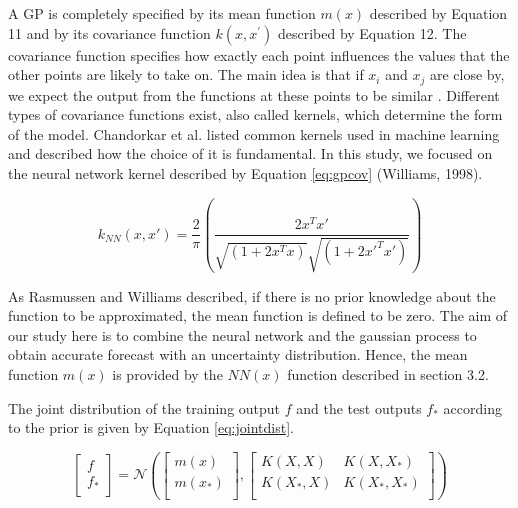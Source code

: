 A GP is completely specified by its mean function  \( m \left( x \right)  \) described by 
Equation 11 and by its covariance function  \( k \left( x,x^{'} \right)  \)  described by Equation 12. 
The covariance function specifies how exactly each point influences the values that the other points are 
likely to take on. The main idea is that if  \( x_{i} \) and  \( x_{j} \)  are close by, 
we expect the output from the functions at these points to be similar . Different types of covariance 
functions exist, also called kernels, which determine the form of the model. Chandorkar et al. \cite{ChandorkarDst} 
listed common kernels used in machine learning and described how the choice of it is fundamental. 
In this study, we focused on the neural network kernel described by Equation \ref{eq:gpcov} (Williams, 1998). 


\begin{equation}\label{eq:gpcov}
 k_{NN} \left( x, x' \right) = \frac{2}{ \pi } \left( \frac{2x^{T}x'}{\sqrt{ \left( 1+2x^{T} x \right) }\sqrt{ \left( 1+2x'^{T}x' \right)}} \right)
\end{equation}


As Rasmussen and Williams \cite{Rasmussen:2005:GPM:1162254} described, if there is no prior knowledge about 
the function to be approximated, the mean function is defined to be zero. The aim of our study here is to 
combine the neural network and the gaussian process to obtain accurate forecast with an uncertainty distribution. 
Hence, the mean function  \( m \left( x \right)  \)  is provided by the  \( NN \left( x \right)  \)  function 
described in section 3.2.


The joint distribution of the training output  \( f \)  and the test outputs  \( f_{\ast} \)  according to the 
prior is given by Equation \ref{eq:jointdist}. 

\begin{equation}\label{eq:jointdist}
  \left[ \begin{array}{ll}
	f\\
	f_{\ast}\\
	\end{array} \right] = \mathcal{N}   \left(  \left[ \begin{array}{ll}
	m \left( x \right) \\
	m \left( x_{\ast} \right) \\
	\end{array} \right] ,  \left[ \begin{matrix}
K \left( X,X \right)   &  K \left( X,X_{\ast} \right) \\
K \left( X_{\ast},X \right)   &  K \left( X_{\ast},X_{\ast} \right) \\
\end{matrix}
 \right]  \right) 
\end{equation}


